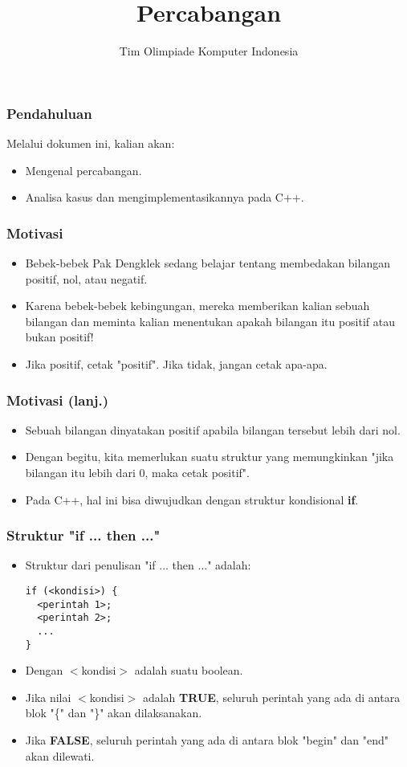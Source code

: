 

\title{Percabangan}
\author{Tim Olimpiade Komputer Indonesia}
\date{}



\begin{frame}
\titlepage
\end{frame}

\begin{frame}
\frametitle{Pendahuluan}
Melalui dokumen ini, kalian akan:
\begin{itemize}
  \item Mengenal percabangan.
  \item Analisa kasus dan mengimplementasikannya pada C++.
\end{itemize}
\end{frame}

\begin{frame}
\frametitle{Motivasi}
\begin{itemize}
  \item Bebek-bebek Pak Dengklek sedang belajar tentang membedakan bilangan positif, nol, atau negatif.
  \item Karena bebek-bebek kebingungan, mereka memberikan kalian sebuah bilangan dan meminta kalian menentukan apakah bilangan itu positif atau bukan positif!
  \item Jika positif, cetak "positif". Jika tidak, jangan cetak apa-apa.
\end{itemize}
\end{frame}

\begin{frame}
\frametitle{Motivasi (lanj.)}
\begin{itemize}
  \item Sebuah bilangan dinyatakan positif apabila bilangan tersebut lebih dari nol.
  \item Dengan begitu, kita memerlukan suatu struktur yang memungkinkan "\alert{jika} bilangan itu lebih dari 0, \alert{maka} cetak positif".
  \item Pada C++, hal ini bisa diwujudkan dengan struktur kondisional \alert{\textbf{if}}.
\end{itemize}
\end{frame}

\begin{frame}[fragile]
\frametitle{Struktur "if ... then ..."}
\begin{itemize}
  \item Struktur dari penulisan "if ... then ..." adalah:
\begin{lstlisting}
if (<kondisi>) {
  <perintah 1>;
  <perintah 2>;
  ...
}
\end{lstlisting}

  \item Dengan $<$kondisi$>$ adalah suatu boolean.
  \item Jika nilai $<$kondisi$>$ adalah \textbf{TRUE}, seluruh perintah yang ada di antara blok "\{" dan "\}" akan dilaksanakan.
  \item Jika \textbf{FALSE}, seluruh perintah yang ada di antara blok "begin" dan "end" akan dilewati.
\end{itemize}
\end{frame}

